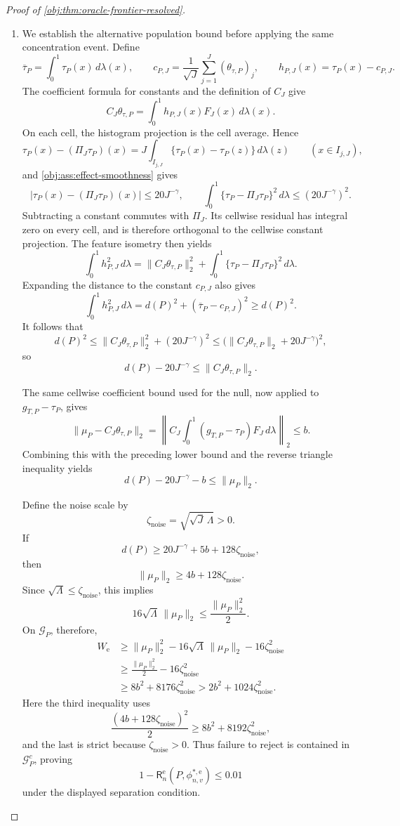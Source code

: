 \begin{proof}[Proof of \cref{obj:thm:oracle-frontier-resolved}]
\begin{enumerate}
\item We establish the alternative population bound before applying the same concentration event. Define
\[
\overline\tau_P=\int_0^1\tau_P(x)\,d\lambda(x),
\qquad
c_{P,J}=\frac1{\sqrt J}\sum_{j=1}^{J}(\theta_{\tau,P})_j,
\qquad
h_{P,J}(x)=\tau_P(x)-c_{P,J}.
\]
The coefficient formula for constants and the definition of \(C_J\) give
\[
C_J\theta_{\tau,P}
=\int_0^1h_{P,J}(x)F_J(x)\,d\lambda(x).
\]
On each cell, the histogram projection is the cell average. Hence
\[
\tau_P(x)-(\Pi_J\tau_P)(x)
=J\int_{I_{j,J}}\{\tau_P(x)-\tau_P(z)\}\,d\lambda(z)
\qquad(x\in I_{j,J}),
\]
and \cref{obj:ass:effect-smoothness} gives
\[
|\tau_P(x)-(\Pi_J\tau_P)(x)|\le20J^{-\gamma},
\qquad
\int_0^1\{\tau_P-\Pi_J\tau_P\}^2\,d\lambda
\le(20J^{-\gamma})^2.
\]
Subtracting a constant commutes with \(\Pi_J\). Its cellwise residual has integral zero on every cell, and is therefore orthogonal to the cellwise constant projection. The feature isometry then yields
\[
\int_0^1h_{P,J}^2\,d\lambda
=
\|C_J\theta_{\tau,P}\|_2^2
+\int_0^1\{\tau_P-\Pi_J\tau_P\}^2\,d\lambda.
\]
Expanding the distance to the constant \(c_{P,J}\) also gives
\[
\int_0^1h_{P,J}^2\,d\lambda
=d(P)^2+(\overline\tau_P-c_{P,J})^2
\ge d(P)^2.
\]
It follows that
\[
d(P)^2
\le\|C_J\theta_{\tau,P}\|_2^2+(20J^{-\gamma})^2
\le\bigl(\|C_J\theta_{\tau,P}\|_2+20J^{-\gamma}\bigr)^2,
\]
so
\[
d(P)-20J^{-\gamma}\le\|C_J\theta_{\tau,P}\|_2.
\]

The same cellwise coefficient bound used for the null, now applied to \(g_{T,P}-\tau_P\), gives
\[
\|\mu_P-C_J\theta_{\tau,P}\|_2
=
\left\|C_J\int_0^1(g_{T,P}-\tau_P)F_J\,d\lambda\right\|_2
\le b.
\]
Combining this with the preceding lower bound and the reverse triangle inequality yields
\[
d(P)-20J^{-\gamma}-b\le\|\mu_P\|_2.
\]

Define the noise scale by
\[
\zeta_{\mathrm{noise}}=\sqrt{\sqrt J\,\Lambda}>0.
\]
If
\[
d(P)\ge20J^{-\gamma}+5b+128\zeta_{\mathrm{noise}},
\]
then
\[
\|\mu_P\|_2\ge4b+128\zeta_{\mathrm{noise}}.
\]
Since \(\sqrt\Lambda\le\zeta_{\mathrm{noise}}\), this implies
\[
16\sqrt\Lambda\,\|\mu_P\|_2\le\frac{\|\mu_P\|_2^2}{2}.
\]
On \(\mathcal G_P\), therefore,
\[
\begin{aligned}
W_{\mathrm e}
&\ge\|\mu_P\|_2^2
-16\sqrt\Lambda\,\|\mu_P\|_2
-16\zeta_{\mathrm{noise}}^2\\
&\ge\frac{\|\mu_P\|_2^2}{2}-16\zeta_{\mathrm{noise}}^2\\
&\ge8b^2+8176\zeta_{\mathrm{noise}}^2
>2b^2+1024\zeta_{\mathrm{noise}}^2.
\end{aligned}
\]
Here the third inequality uses
\[
\frac{(4b+128\zeta_{\mathrm{noise}})^2}{2}
\ge8b^2+8192\zeta_{\mathrm{noise}}^2,
\]
and the last is strict because \(\zeta_{\mathrm{noise}}>0\).
Thus failure to reject is contained in \(\mathcal G_P^c\), proving
\[
1-\mathsf R_n^{\mathrm e}(P,\phi^{*,\mathrm e}_{n,v})\le0.01
\]
under the displayed separation condition.


\end{enumerate}
\end{proof}

